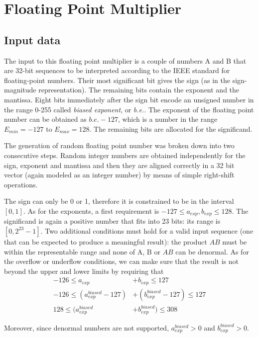 \chapter{Floating Point Multiplier}

\section{Input data}
The input to this floating point multiplier is a couple of numbers A and B that are 32-bit sequences to be interpreted according to the IEEE standard for floating-point numbers. Their most significant bit gives the sign (as in the sign-magnitude representation). The remaining bits contain the exponent and the mantissa. Eight bits immediately after the sign bit encode an unsigned number in the range 0-255 called \textit{biased exponent}, or \textit{b.e.}. The exponent of the floating point number can be obtained as $\textit{b.e.} - 127$, which is a number in the range $E_{min} = -127$ to $E_{max}=128$.
The remaining bits are allocated for the significand.

 The generation of random floating point number was broken down into two consecutive steps. Random integer  numbers are obtained independently for the sign, exponent and mantissa and then they are aligned correctly in a 32 bit vector (again modeled as an integer number) by means of simple right-shift operations.
 
 The sign can only be 0 or 1, therefore it is constrained to be in the interval $[0,1]$. As for the exponents, a first requirement is $-127 \leq a_{exp}, b_{exp} \leq 128$. The significand is again a positive number that fits into 23 bits: its range is $[0, 2^{23}-1]$.
 Two additional conditions must hold for a valid input sequence (one that can be expected to produce a meaningful result): the product $AB$ must be within the representable range and none of A, B or $AB$ can be denormal. As for the overflow or underflow conditions, we can make sure that the result is not beyond the upper and lower limits by requiring that
 \begin{align}
-126 \leq a_{exp} &+ b_{exp} \leq 127 \nonumber\\
-126 \leq (a_{exp}^{biased} - 127) &+ (b_{exp}^{biased} - 127) \leq 127 \nonumber\\
128 \leq(a_{exp}^{biased} &+ b_{exp}^{biased}) \leq 308 \label{eqn:constraint}
 \end{align}
 
Moreover, since denormal numbers are not supported, $
a_{exp}^{biased} > 0$ and $b_{exp}^{biased} > 0$.


